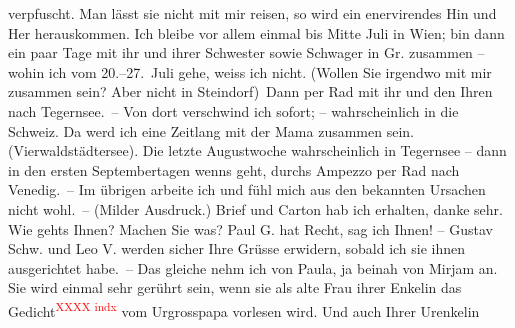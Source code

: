 {\begin{ledgroupsized}[t]{13cm}
               verpfuscht. Man lässt sie nicht
               mit mir reisen, so wird ein enervirendes Hin und Her herauskommen. Ich bleibe vor
               allem einmal bis Mitte Juli in Wien; bin
               dann ein paar Tage mit ihr und
               ihrer Schwester sowie Schwager in Gr. zusammen – wohin ich vom
                  20.–27. Juli gehe, weiss ich nicht. (Wollen Sie irgendwo
               mit mir zusammen sein? Aber nicht in Steindorf) Dann per Rad mit ihr und den Ihren nach Tegernsee. – Von dort verschwind ich sofort; –
               wahrscheinlich in die Schweiz. Da werd ich eine Zeitlang mit der Mama zusammen sein. (Vierwaldstädtersee). Die letzte Augustwoche
               wahrscheinlich in Tegernsee – dann in den ersten
                  Septembertagen wenns geht, durchs Ampezzo per Rad nach Venedig. –\pend
           \pstart
           Im übrigen arbeite ich und fühl mich aus den bekannten Ursachen nicht wohl. – (Milder
               Ausdruck.)\pend
           \pstart
           Brief und Carton hab ich erhalten, danke sehr. Wie gehts Ihnen? Machen Sie was? Paul G. hat Recht, sag ich Ihnen! – Gustav Schw. und Leo V. werden sicher Ihre Grüsse erwidern, sobald ich sie ihnen ausgerichtet
               habe. – Das gleiche nehm ich von Paula, ja beinah
               von Mirjam an. Sie wird einmal sehr gerührt sein,
               wenn sie als alte Frau ihrer Enkelin das Gedicht\textcolor{red}{\textsuperscript{XXXX indx}} vom Urgrosspapa vorlesen wird. Und auch Ihrer Urenkelin

\end{ledgroupsized}}
